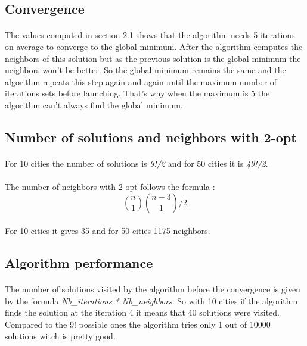 \documentclass[12pt,oneside,a4paper]{article}
\begin{document}
\subsection{Convergence}
\paragraph{}
    The values computed in section 2.1 shows that the algorithm needs 5 iterations on average to converge to the
    global minimum. After the algorithm computes the neighbors of this solution but as the previous solution is the
    global minimum the neighbors won't be better. So the global minimum remains the same and the algorithm repeats this step
    again and again until the maximum number of iterations sets before launching. That's why when the maximum is 5 the
    algorithm can't always find the global minimum.

\subsection{Number of solutions and neighbors with 2-opt}
\paragraph{}
    For 10 cities the number of solutions is \textit{9!/2} and for 50 cities it is \textit{49!/2}.
\paragraph{}
    The number of neighbors with 2-opt follows the formula :
    \[\binom{n}{1}\binom{n-3}{1}/2\]
\paragraph{}
    For 10 cities it gives 35 and for 50 cities 1175 neighbors.

\subsection{Algorithm performance}
\paragraph{}
    The number of solutions visited by the algorithm before the convergence is given by the formula
    \textit{Nb\_iterations * Nb\_neighbors}. So with 10 cities if the algorithm finds the solution at the 
    iteration 4 it means that 40 solutions were visited. Compared to the 9! possible ones the algorithm tries only 1
    out of 10000 solutions witch is pretty good.
\newpage
\end{document}
